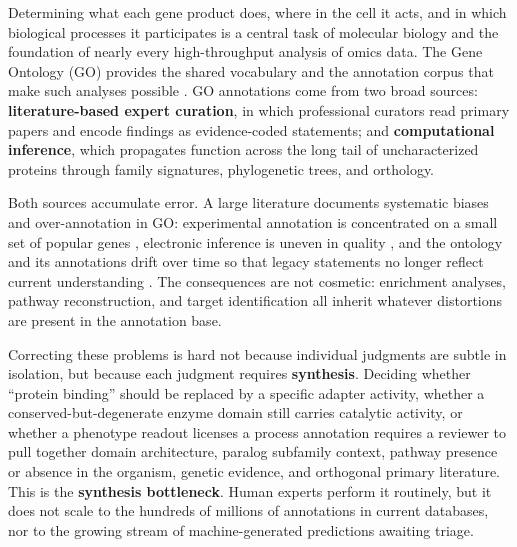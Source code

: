\documentclass[11pt]{article}
\begin{document}
Determining what each gene product does, where in the cell it acts, and in which
biological processes it participates is a central task of molecular biology and
the foundation of nearly every high-throughput analysis of omics data. The Gene
Ontology (GO) provides the shared vocabulary and the annotation corpus that make
such analyses possible \cite{ashburner2000,goconsortium2023}. GO annotations come
from two broad sources: \textbf{literature-based expert curation}, in which
professional curators read primary papers and encode findings as evidence-coded
statements; and \textbf{computational inference}, which propagates function across
the long tail of uncharacterized proteins through family signatures, phylogenetic
trees, and orthology.

Both sources accumulate error. A large literature documents systematic biases and
over-annotation in GO: experimental annotation is concentrated on a small set of
popular genes \cite{haynes2018,schnoes2013}, electronic inference is uneven in
quality \cite{skunca2012}, and the ontology and its annotations drift over time so
that legacy statements no longer reflect current understanding
\cite{gaudet2017}. The consequences are not cosmetic: enrichment analyses, pathway
reconstruction, and target identification all inherit whatever distortions are
present in the annotation base.

Correcting these problems is hard not because individual judgments are subtle in
isolation, but because each judgment requires \textbf{synthesis}. Deciding whether
``protein binding'' should be replaced by a specific adapter activity, whether a
conserved-but-degenerate enzyme domain still carries catalytic activity, or
whether a phenotype readout licenses a process annotation requires a reviewer to
pull together domain architecture, paralog subfamily context, pathway presence or
absence in the organism, genetic evidence, and orthogonal primary literature. This
is the \textbf{synthesis bottleneck}. Human experts perform it routinely, but it
does not scale to the hundreds of millions of annotations in current databases, nor
to the growing stream of machine-generated predictions awaiting triage.
\end{document}
